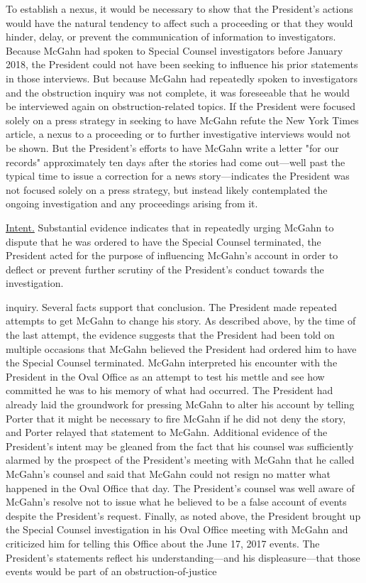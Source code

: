 {To establish a nexus, it would be necessary to show that the President's actions would have the natural tendency to affect such a proceeding or that they would hinder, delay, or prevent the communication of information to investigators.
Because McGahn had spoken to Special Counsel investigators before January 2018, the President could not have been seeking to influence his prior statements in those interviews.
But because McGahn had repeatedly spoken to investigators and the obstruction inquiry was not complete, it was foreseeable that he would be interviewed again on obstruction-related topics.
If the President were focused solely on a press strategy in seeking to have McGahn refute the New York Times article, a nexus to a proceeding or to further investigative interviews would not be shown.
But the President's efforts to have McGahn write a letter "for our records" approximately ten days after the stories had come out---well past the typical time to issue a correction for a news story---indicates the President was not focused solely on a press strategy, but instead likely contemplated the ongoing investigation and any proceedings arising from it.

\underline{Intent.}
Substantial evidence indicates that in repeatedly urging McGahn to dispute that he was ordered to have the Special Counsel terminated, the President acted for the purpose of influencing McGahn's account in order to deflect or prevent further scrutiny of the President's conduct towards the investigation.

inquiry.
Several facts support that conclusion.
The President made repeated attempts to get McGahn to change his story.
As described above, by the time of the last attempt, the evidence suggests that the President had been told on multiple occasions that McGahn believed the President had ordered him to have the Special Counsel terminated.
McGahn interpreted his encounter with the President in the Oval Office as an attempt to test his mettle and see how committed he was to his memory of what had occurred.
The President had already laid the groundwork for pressing McGahn to alter his account by telling Porter that it might be necessary to fire McGahn if he did not deny the story, and Porter relayed that statement to McGahn.
Additional evidence of the President's intent may be gleaned from the fact that his counsel was sufficiently alarmed by the prospect of the President's meeting with McGahn that he called McGahn's counsel and said that McGahn could not resign no matter what happened in the Oval Office that day.
The President's counsel was well aware of McGahn's resolve not to issue what he believed to be a false account of events despite the President's request.
Finally, as noted above, the President brought up the Special Counsel investigation in his Oval Office meeting with McGahn and criticized him for telling this Office about the June 17, 2017 events.
The President's statements reflect his understanding---and his displeasure---that those events would be part of an obstruction-of-justice

}
